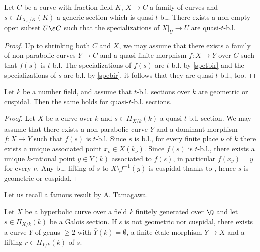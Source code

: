 \begin{lemma}
\notready\label{spequasi}
	Let $C$ be a curve with fraction field $K$, $X\to C$ a family of curves and $s\in\Pi_{X_{K}/K}(K)$ a generic section which is quasi-$t$-b.l. There exists a non-empty open subset $U\s C$ such that the specializations of $X|_{U}\to U$ are quasi-$t$-b.l.
	\begin{proof}
		Up to shrinking both $C$ and $X$, we may assume that there exists a family of non-parabolic curves $Y\to C$ and a quasi-finite morphism $f:X\to Y$ over $C$ such that $f(s)$ is $t$-b.l. The specializations of $f(s)$ are $t$-b.l. by \autoref{spetbir} and the specializations of $s$ are b.l. by \autoref{spebir}, it follows that they are quasi-$t$-b.l., too.
	\end{proof}
\end{lemma}

\begin{lemma}
\notready\label{quasinf}
	Let $k$ be a number field, and assume that $t$-b.l. sections over $k$ are geometric or cuspidal. Then the same holds for quasi-$t$-b.l. sections.
	\begin{proof}
		Let $X$ be a curve over $k$ and $s\in\Pi_{X/k}(k)$ a quasi-$t$-b.l. section. We may assume that there exists a non-parabolic curve $Y$ and a dominant morphism $f:X\to Y$ such that $f(s)$ is $t$-b.l. Since $s$ is b.l., for every finite place $\nu$ of $k$ there exists a unique associated point $x_{\nu}\in \bar{X}(k_{\nu})$. Since $f(s)$ is $t$-b.l., there exists a unique $k$-rational point $y\in \bar{Y}(k)$ associated to $f(s)$, in particular $f(x_{\nu})=y$ for every $\nu$. Any b.l. lifting of $s$ to $X\setminus f^{-1}(y)$ is cuspidal thanks to \cite[Theorem B]{sti15}, hence $s$ is geometric or cuspidal.
	\end{proof}
\end{lemma}

Let us recall a famous result by A. Tamagawa.

\begin{proposition}[Tamagawa]
\notready\label{tama}
    Let $X$ be a hyperbolic curve over a field $k$ finitely generated over $\Q$ and let $s\in\Pi_{X/k}(k)$ be a Galois section. If $s$ is not geometric nor cuspidal, there exists a curve $Y$ of genus $\ge 2$ with $\bar{Y}(k)=\emptyset$, a finite étale morphism $Y\to X$ and a lifting $r\in\Pi_{Y/k}(k)$ of $s$.
\end{proposition}

